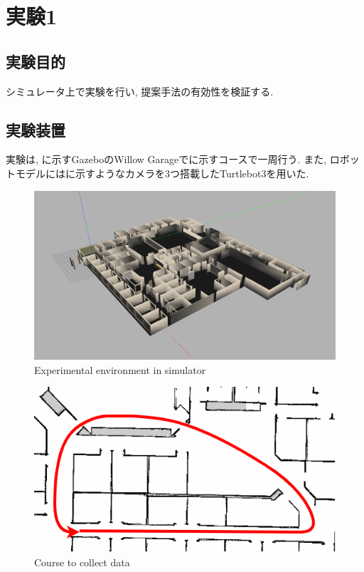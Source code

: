 
\section{実験1}
\subsection{実験目的}
シミュレータ上で実験を行い, 提案手法の有効性を検証する.

\subsection{実験装置}
実験は, に示すGazebo\cite{gazebo}のWillow Garage\cite{willow}でに示すコースで一周行う. また, ロボットモデルにはに示すようなカメラを3つ搭載したTurtlebot3\cite{turtlebot3}を用いた. 

\begin{figure}[h]
  \centering
  \includegraphics[keepaspectratio, scale=0.15]{images/gazebo.png}
  \caption{Experimental environment in simulator}
  \label{Fig:gazebo}
  \end{figure}

\newpage
\vspace{20mm}
\begin{figure}[h]
  \centering
  \includegraphics[keepaspectratio, scale=0.5]{images/willow-path.png}
  \caption{Course to collect data}
  \label{Fig:willow-garage}
  \end{figure}

